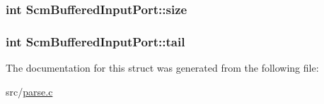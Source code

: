 \hypertarget{struct_scm_buffered_input_port_af550724c6e90343a2b7f8e44570e3be8}{
\subsubsection[{size}]{\setlength{\rightskip}{0pt plus 5cm}int Scm\-Buffered\-Input\-Port\-::size}}\label{struct_scm_buffered_input_port_af550724c6e90343a2b7f8e44570e3be8}
\hypertarget{struct_scm_buffered_input_port_ab0d75f54a548adc789122db1a80c6e21}{
\subsubsection[{tail}]{\setlength{\rightskip}{0pt plus 5cm}int Scm\-Buffered\-Input\-Port\-::tail}}\label{struct_scm_buffered_input_port_ab0d75f54a548adc789122db1a80c6e21}


The documentation for this struct was generated from the following file\-:\begin{DoxyCompactItemize}
\item 
src/\hyperlink{parse_8c}{parse.\-c}\end{DoxyCompactItemize}
